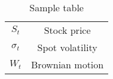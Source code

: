 \begin{table}[htbp]
    \centering
    \begin{tabular}{|c|c|}
        \hline
        $S_t$ & Stock price \\
        $\sigma_t$ & Spot volatility \\
        $W_t$ & Brownian motion\\
        \hline
    \end{tabular}
    \caption{Sample table}
\end{table}
